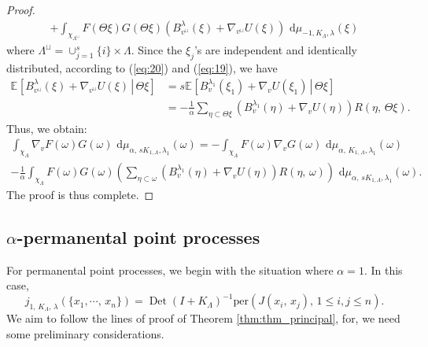 \documentclass[11pt,a4paper]{amsart}
\begin{document}
\begin{proof}
\begin{multline*}
    +\int_{\chi_{\Lambda^\sqcup}}
    F(\Theta\xi)G(\Theta\xi)\left(B_{v^\sqcup}^\lambda
      (\xi)+\nabla_{v^\sqcup}U(\xi)\right){\text{ d}}\mu_{-1,K_\Lambda,\lambda}(\xi)
  \end{multline*}
  where ${\Lambda^\sqcup}=\cup_{j=1}^s \{i\}\times \Lambda.$ Since the
  $\xi_j$'s are independent and identically distributed, according to
  (\ref{eq:20}) and (\ref{eq:19}), we have
  \begin{align*}
    {{\mathbb E}_{{}}\left[{{\left.B_{v^\sqcup}^\lambda (\xi)+\nabla_{v^\sqcup}U(\xi)\,
      \right|\, \Theta\xi}}\right]}&=s
    {{\mathbb E}_{{}}\left[{{\left.B^{\lambda_1}_v(\xi_1)+\nabla_vU(\xi_1)\,
      \right |\, \Theta\xi}}\right]}\\
    &=-\frac 1\alpha\sum_{\eta\subset\Theta\xi}
    (B^{\lambda_1}_v(\eta)+\nabla_vU(\eta))R(\eta,\, \Theta\xi).
  \end{align*}
  Thus, we obtain:
  \begin{multline*}
    \int_{\chi_\Lambda} \nabla_{v} F(\omega) G(\omega){\text{ d}}\mu_{\alpha,\,
      sK_{1,\Lambda},\lambda_1}(\omega) =-\int_{\chi_\Lambda}
    F(\omega)\nabla_{v} G(\omega){\text{ d}}\mu_{\alpha,\, K_{1,\,\Lambda},\lambda_1}(\omega)\\
    -\frac 1\alpha\int_{\chi_\Lambda}
    F(\omega)G(\omega)\left(\sum_{\eta\subset\omega}
      (B^{\lambda_1}_v(\eta)+\nabla_vU(\eta))R(\eta,\, \omega)
    \right){\text{ d}}\mu_{\alpha,\,sK_{1,\Lambda},\lambda_1}(\omega).
  \end{multline*}
  The proof is thus complete.
\end{proof}
\subsection{$\alpha$-permanental point processes}
\label{sec:alpha-perm-point}
For permanental point processes, we begin with the situation where
$\alpha=1$. In this case,
\begin{equation*}
  j_{1,\, K_\Lambda,\,
    \lambda}(\{x_1,\cdots,\, x_n\})={\operatorname{Det}}(I+K_\Lambda)^{-1} \text{per}
  (J(x_i,\, x_j), \, 1\le i,j\le n).
\end{equation*}
We aim to follow the lines of proof of Theorem
\ref{thm:thm_principal}, for, we need some preliminary considerations.
\end{document}

